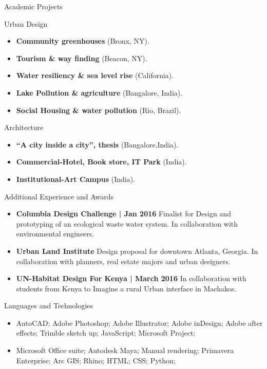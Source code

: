 \documentclass[]{nakulcv}
\begin{document}
	\begin{cvsection}{Academic Projects}
		\begin{cvsubsection}{Urban Design}{}{}
			\begin{itemize}
				\item \textbf{Community greenhouses} (Bronx, NY). 
				\item \textbf{Tourism \& way finding} (Beacon, NY). 
				\item \textbf{Water resiliency \& sea level rise} (California).
				\item \textbf{Lake Pollution \& agriculture} (Bangalore, India).
				\item \textbf{Social Housing \& water pollution} (Rio, Brazil). 
			\end{itemize}
		\end{cvsubsection}
		\begin{cvsubsection}{Architecture}{}{}
			\begin{itemize}
				\item \textbf{“A city inside a city”, thesis} (Bangalore,India).
				\item \textbf{Commercial-Hotel, Book store, IT Park} (India).
				\item \textbf{Institutional-Art Campus} (India).
			\end{itemize}
		\end{cvsubsection}
	\end{cvsection}
	\begin{cvsection}{Additional Experience and Awards}
		\begin{cvsubsection}{}{}{}	
			\begin{itemize}
				\item \textbf{Columbia Design Challenge | Jan 2016} Finalist for Design and prototyping of an ecological waste water system. In collaboration with environmental engineers. 
				\item \textbf{Urban Land Institute} Design proposal for downtown Atlanta, Georgia. In collaboration with planners, real estate majors and urban designers.
				\item \textbf{UN-Habitat Design For Kenya | March 2016} In collaboration with students from Kenya to Imagine a rural Urban interface in Machakos.
			\end{itemize}
		\end{cvsubsection}
	\end{cvsection}
	\begin{cvsection}{Languages and Technologies}
		\begin{cvsubsection}{}{}{}	
			\begin{itemize}
				\item AutoCAD; Adobe Photoshop; Adobe Illustrator; Adobe inDesign; Adobe after effects; Trimble sketch up; JavaScript; Microsoft Project;
				\item Microsoft Office suite; Autodesk Maya; Manual rendering; Primavera Enterprise; Arc GIS; Rhino; HTML; CSS; Python;
			\end{itemize}
		\end{cvsubsection}
	\end{cvsection}
\end{document}
